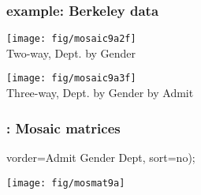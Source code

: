 \begin{frame}
  \frametitle{ example: Berkeley data}
 \begin{minipage}[t]{.45\textwidth}
  \texttt{[image: fig/mosaic9a2f]}
  \\ \centering Two-way, Dept. by Gender
 \end{minipage}%
 \hfill
 \begin{minipage}[t]{.45\textwidth}
  \texttt{[image: fig/mosaic9a3f]}
  \\ \centering Three-way, Dept. by Gender by Admit
 \end{minipage}

 
\end{frame}

\begin{comment}
\begin{frame}[fragile]
  \frametitle{\IML\ example}
\begin{Verbatim}[fontsize=\small,label=\fbox{\texttt{mosaic9.sas}},baselinestretch=0.7]
proc iml;
   \sascomment{*-- Berkeley Admissions data;}
   dim = \{2 2 6\};
   vnames = \{"Admit" "Gender" "Dept"\};       \sascomment{/* var names   */}
   lnames = \{                                \sascomment{/* level names */}
     "Admitted" "Rejected" " "  " "  " "  " ",
     "Male"  "Female" " "  " "  " "  " ",
     "A" "B" "C" "D" "E" "F"\};
          \sascomment{/* Admit Not Admit Not */}
   table = \{ 512  313,   89   19,
             353  207,   17    8,
             120  205,  202  391,
             138  279,  131  244,
              53  138,   94  299,
              22  351,   24  317\};
   reset storage=mosaic.mosaic;
   \sasemph{load module=_all_;}          \sascomment{*-- Load mosaic modules;}

   title = 'Model: &MODEL';
   plots=2:3;
   fittype='joint';
   \sasemph{run mosaic(dim, table, vnames, lnames, plots, title);}
 quit;
\end{Verbatim}
\end{frame}
\end{comment}

\begin{frame}[fragile]
  \frametitle{: Mosaic matrices}
  \vspace{1.5ex}

\begin{Input}[label=\fbox{\texttt{mosmat9m.sas}}]
   vorder=Admit Gender Dept, sort=no);
\end{Input}
	  \vspace{.5ex}
	  \begin{center}
	  \texttt{[image: fig/mosmat9a]}
	  \end{center}
\end{frame}

